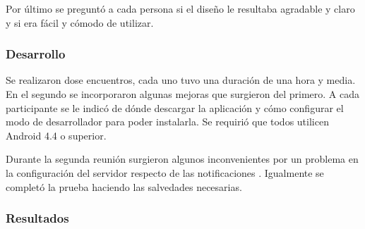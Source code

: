Por último se preguntó a cada persona si el diseño le resultaba agradable y claro y si era fácil y cómodo de utilizar.

\subsubsection{Desarrollo}
\label{desarrollo_pruebas_usabilidad_desarrollo}

Se realizaron dose encuentros, cada uno tuvo una duración de una hora y media. En el segundo se incorporaron algunas mejoras que surgieron del primero.
A cada participante se le indicó de dónde descargar la aplicación y cómo configurar el modo de desarrollador para poder instalarla.
Se requirió que todos utilicen Android 4.4 o superior.

Durante la segunda reunión surgieron algunos inconvenientes por un problema en la configuración del servidor respecto de las notificaciones . Igualmente se completó la prueba haciendo las salvedades necesarias.


\subsubsection{Resultados}
\label{desarrollo_pruebas_usabilidad_resultados}

